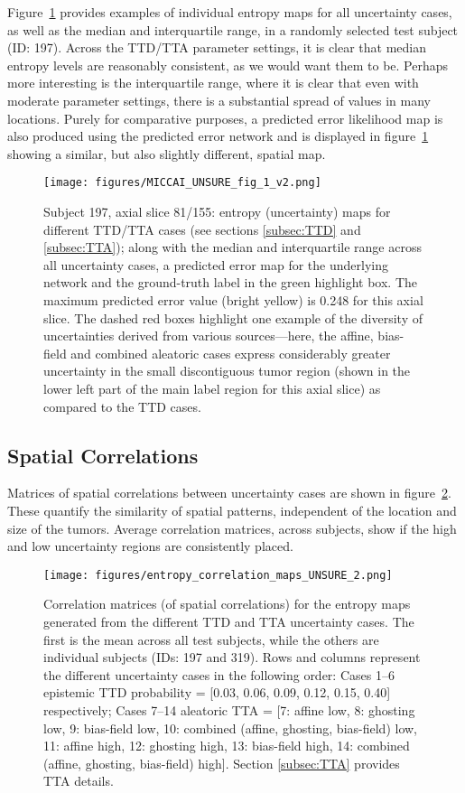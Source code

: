\documentclass[runningheads]{llncs}
\begin{document}
Figure~\ref{fig1} provides examples of individual entropy maps for all uncertainty cases, as well as the median and interquartile range, in a randomly selected test subject (ID: 197). Across the TTD/TTA parameter settings, it is clear that median entropy levels are reasonably consistent, as we would want them to be. Perhaps more interesting is the interquartile range, where it is clear that even with moderate parameter settings, there is a substantial spread of values in many locations. Purely for comparative purposes, a predicted error likelihood map is also produced using the predicted error network and is displayed in figure~\ref{fig1} showing a similar, but also slightly different, spatial map. 

\begin{figure}[tb]
\centerline{\texttt{[image: figures/MICCAI\_UNSURE\_fig\_1\_v2.png]}}
\caption{Subject 197, axial slice 81/155: entropy (uncertainty) maps for different TTD/TTA cases (see sections \ref{subsec:TTD} and \ref{subsec:TTA}); along with the median and interquartile range across all uncertainty cases, a predicted error map for the underlying network and the ground-truth label in the green highlight box. The maximum predicted error value (bright yellow) is 0.248 for this axial slice. The dashed red boxes highlight one example of the diversity of uncertainties derived from various sources---here, the affine, bias-field and combined aleatoric cases express considerably greater uncertainty in the small discontiguous tumor region (shown in the lower left part of the main label region for this axial slice) as compared to the TTD cases.} \label{fig1}
\end{figure}

\subsection{Spatial Correlations}

Matrices of spatial correlations between uncertainty cases are shown in figure~\ref{fig2}. These quantify the similarity of spatial patterns, independent of the location and size of the tumors. Average correlation matrices, across subjects, show if the high and low uncertainty regions are consistently placed.

\begin{figure}[t]
\centerline{\texttt{[image: figures/entropy\_correlation\_maps\_UNSURE\_2.png]}}
\caption{Correlation matrices (of spatial correlations) for the entropy maps generated from the different TTD and TTA uncertainty cases. The first is the mean across all test subjects, while the others are individual subjects (IDs: 197 and 319).
Rows and columns represent the different uncertainty cases in the following order: Cases 1--6 epistemic TTD probability = [0.03, 0.06, 0.09, 0.12, 0.15, 0.40] respectively; Cases 7--14 aleatoric TTA = [7: affine low, 8: ghosting low, 9: bias-field low, 10: combined (affine, ghosting, bias-field) low, 11: affine high, 12: ghosting high, 13: bias-field high, 14: combined (affine, ghosting, bias-field) high]. Section \ref{subsec:TTA} provides TTA details.} \label{fig2}
\end{figure}
\end{document}
